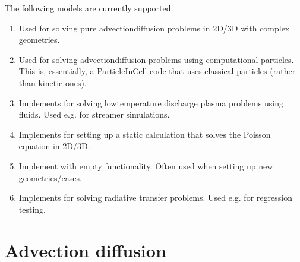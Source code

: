 \documentclass[letterpaper,10pt,english]{sphinxmanual}
\begin{document}
The following models are currently supported:
\begin{enumerate}
%
\item {} 
{\hyperref[\detokenize{Applications/AdvectionDiffusionModel:chap-advectiondiffusionmodel}]{}} Used for solving pure advection\sphinxhyphen{}diffusion problems in 2D/3D with complex geometries.

\item {} 
{\hyperref[\detokenize{Applications/BrownianWalkerModel:chap-brownianwalkermodel}]{}} Used for solving advection\sphinxhyphen{}diffusion problems using computational particles.
This is, essentially, a Particle\sphinxhyphen{}In\sphinxhyphen{}Cell code that uses classical particles (rather than kinetic ones).

\item {} 
{\hyperref[\detokenize{Applications/CdrPlasmaModel:chap-cdrplasmamodel}]{}} Implements  for solving low\sphinxhyphen{}temperature discharge plasma problems using fluids.
Used e.g. for streamer simulations.

\item {} 
{\hyperref[\detokenize{Applications/ElectrostaticsModel:chap-electrostaticsmodel}]{}} Implements  for setting up a static calculation that solves the Poisson equation in 2D/3D.

\item {} 
{\hyperref[\detokenize{Applications/GeometryModel:chap-geometrymodel}]{}} Implement  with empty functionality. Often used when setting up new geometries/cases.

\item {} 
{\hyperref[\detokenize{Applications/RadiativeTransferModel:chap-radiativetransfermodel}]{}} Implements  for solving radiative transfer problems. Used e.g. for regression testing.

\end{enumerate}


\section{Advection diffusion}
\label{\detokenize{Applications/AdvectionDiffusionModel:advection-diffusion}}\label{\detokenize{Applications/AdvectionDiffusionModel:chap-advectiondiffusionmodel}}\label{\detokenize{Applications/AdvectionDiffusionModel::doc}}
\end{document}
